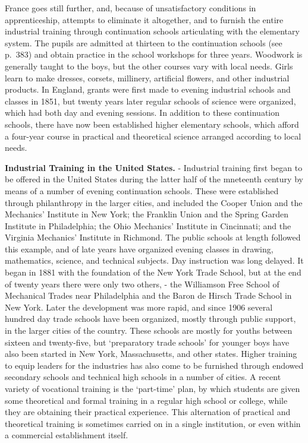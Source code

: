 \documentclass[
]{book}
\begin{document}
France goes still further, and, because of unsatisfactory conditions in apprenticeship, attempts to eliminate it altogether, and to furnish the entire industrial training through continuation schools articulating with the elementary system. The pupils are admitted at thirteen to the continuation schools (see p.~383) and obtain practice in the school workshops for three years. Woodwork is generally taught to the boys, but the other courses vary with local needs. Girls learn to make dresses, corsets, millinery, artificial flowers, and other industrial products. In England, grants were first made to evening industrial schools and classes in 1851, but twenty years later regular schools of science were organized, which had both day and evening sessions. In addition to these continuation schools, there have now been established higher elementary schools, which afford a four-year course in practical and theoretical science arranged according to local needs.

\textbf{Industrial Training in the United States.} - Industrial training first began to be offered in the United States during the latter half of the mneteenth century by means of a number of evening continuation schools. These were established through philanthropy in the larger cities, and included the Cooper Union and the Mechanics' Institute in New York; the Franklin Union and the Spring Garden Institute in Philadelphia; the Ohio Mechanics' Institute in Cincinnati; and the Virginia Mechanics' Institute in Richmond. The public schools at length followed this example, and of late years have organized evening classes in drawing, mathematics, science, and technical subjects. Day instruction was long delayed. It began in 1881 with the foundation of the New York Trade School, but at the end of twenty years there were only two others, - the Williamson Free School of Mechanical Trades near Philadelphia and the Baron de Hirsch Trade School in New York. Later the development was more rapid, and since 1906 several hundred day trade schools have been organized, mostly through public support, in the larger cities of the country. These schools are mostly for youths between sixteen and twenty-five, but `preparatory trade schools' for younger boys have also been started in New York, Massachusetts, and other states. Higher training to equip leaders for the industries has also come to be furnished through endowed secondary schools and technical high schools in a number of cities. A recent variety of vocational training is the `part-time' plan, by which students are given some theoretical and formal training in a regular high school or college, while they are obtaining their practical experience. This alternation of practical and theoretical training is sometimes carried on in a single institution, or even within a commercial establishment itself.
\end{document}
